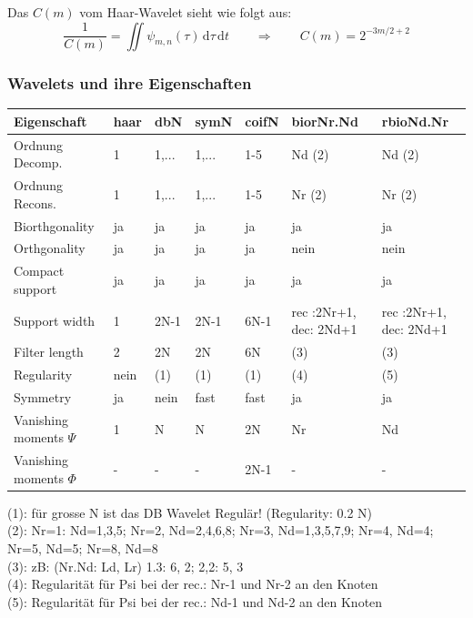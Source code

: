 Das $C(m)$ vom Haar-Wavelet sieht wie folgt aus:
\[
	\frac{1}{C(m)} = \iint \psi_{m,n}(\tau) \,\mathrm{d}\tau \,\mathrm{d}t
	\qquad \Rightarrow \qquad  
	C(m)= 2^{-3m/2 + 2} 
\]


\subsubsection{Wavelets und ihre Eigenschaften}


\begin{tabular}{l||l|l|l|l|l|l}
	\textbf{Eigenschaft} & \textbf{haar} & \textbf{dbN}	& \textbf{symN}	& \textbf{coifN} & \textbf{biorNr.Nd}	& \textbf{rbioNd.Nr}	\\
	\hline
	\hline
	Ordnung Decomp.				& 1		& 1,...	& 1,...	& 1-5	& Nd (2)					& Nd (2)	\\
	\hline
	Ordnung Recons.				& 1		& 1,...	& 1,...	& 1-5	& Nr (2)					& Nr (2)	\\
	\hline
	Biorthgonality 				& ja	& ja	& ja	& ja	& ja						& ja		\\
	\hline
	Orthgonality 				& ja	& ja	& ja	& ja	& nein						& nein		\\
	\hline
	Compact support 			& ja 	& ja	& ja	& ja	& ja						& ja		\\
	\hline
	Support width 				& 1 	& 2N-1	& 2N-1	& 6N-1	& rec :2Nr+1, dec: 2Nd+1	& rec :2Nr+1, dec: 2Nd+1	\\
	\hline
	Filter length 				&  2 	& 2N	& 2N	& 6N	& (3) 						& (3)		\\
	\hline
	Regularity 					& nein 	& (1)	& (1)	& (1)	& (4)						& (5)	\\
	\hline
	Symmetry  					& ja 	& nein	& fast	& fast	& ja						& ja		\\
	\hline
	Vanishing moments $\Psi$ 	& 1		& 	N	&	N	& 2N	& Nr						& Nd		\\
	\hline
	Vanishing moments $\Phi$ 	& -		& 	-	&	-	& 2N-1	& - 						& -		\\
\end{tabular}

\vspace{0.2cm}

(1): für grosse N ist das DB Wavelet Regulär! (Regularity: 0.2 N)\\
(2): Nr=1: Nd=1,3,5; Nr=2, Nd=2,4,6,8; Nr=3, Nd=1,3,5,7,9; Nr=4, Nd=4; Nr=5, Nd=5; Nr=8, Nd=8\\
(3): zB: (Nr.Nd: Ld, Lr) 1.3: 6, 2; 2,2: 5, 3 \\
(4): Regularität für Psi bei der rec.: Nr-1 und Nr-2 an den Knoten\\
(5): Regularität für Psi bei der rec.: Nd-1 und Nd-2 an den Knoten

